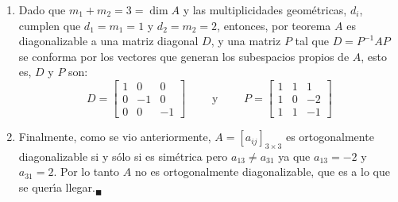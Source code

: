\begin{solucion}
\begin{enumerate}[$a$)]
  \item Dado que $m_1+m_2 = 3 = \dim A$ y las multiplicidades geom\'etricas, $d_i$, cumplen que $d_1 = m_1 = 1$ y $d_2 = m_2 = 2$, entonces, por teorema $A$ es diagonalizable a una matriz diagonal $D$, y una matriz $P$ tal que $D = P^{-1}AP$ se conforma por los vectores que generan los subespacios propios de $A$, esto es, $D$ y $P$ son:
  \begin{equation*}
   D = 
   \begin{bmatrix}
    1 &  0 &  0 \\
    0 & -1 &  0 \\
    0 &  0 & -1
   \end{bmatrix}
   \qquad \text{ y } \qquad 
   P = 
   \begin{bmatrix}
    1 & 1 &  1 \\
    1 & 0 & -2 \\
    1 & 1 & -1
   \end{bmatrix}
  \end{equation*}
  
  \item Finalmente, como se vio anteriormente, $A = [a_{ij}]_{3\times 3}$ es ortogonalmente diagonalizable si y s\'olo si es sim\'etrica pero $a_{13}\neq a_{31}$ ya que $a_{13} = -2$ y $a_{31} = 2$. Por lo tanto $A$ no es ortogonalmente diagonalizable, que es a lo que se quer\'{\i}a llegar.${}_{\blacksquare}$
 \end{enumerate}
\end{solucion}
